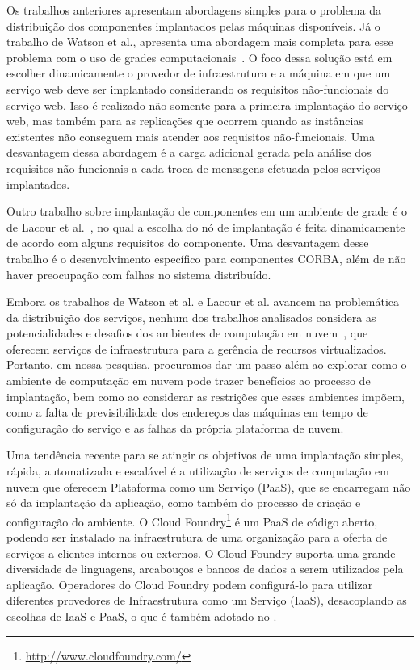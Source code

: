 Os trabalhos anteriores apresentam abordagens simples para o problema da distribuição dos componentes implantados pelas máquinas disponíveis. Já o trabalho de Watson et al., apresenta uma abordagem mais completa para esse problema com o uso de grades computacionais~\cite{Watson2006Dynasoar}. O foco dessa solução está em escolher dinamicamente o provedor de infraestrutura e a máquina em que um serviço web deve ser implantado considerando os requisitos não-funcionais do serviço web. Isso é realizado não somente para a primeira implantação do serviço web, mas também para as replicações que ocorrem quando as instâncias existentes não conseguem mais atender aos requisitos não-funcionais. Uma desvantagem dessa abordagem é a carga adicional gerada pela análise dos requisitos não-funcionais a cada troca de mensagens efetuada pelos serviços implantados. 

Outro trabalho sobre implantação de componentes em um ambiente de grade é o de Lacour et al.~\cite{Lacour2004Corba}, no qual a escolha do nó de implantação é feita dinamicamente de acordo com alguns requisitos do componente. Uma desvantagem desse trabalho é o desenvolvimento específico para componentes CORBA, além de não haver preocupação com falhas no sistema distribuído.

Embora os trabalhos de Watson et al. e Lacour et al. avancem na problemática da distribuição dos serviços, nenhum dos trabalhos analisados considera as potencialidades e desafios dos ambientes de computação em nuvem~\cite{Amazon2012Practices}, que oferecem serviços de infraestrutura para a gerência de recursos virtualizados. Portanto, em nossa pesquisa, procuramos dar um passo além ao explorar como o ambiente de computação em nuvem pode trazer benefícios ao processo de implantação, bem como ao considerar as restrições que esses ambientes impõem, como a falta de previsibilidade dos endereços das máquinas em tempo de configuração do serviço e as falhas da própria plataforma de nuvem.


Uma tendência recente para se atingir os objetivos de uma implantação simples, rápida, automatizada e escalável é a utilização de serviços de computação em nuvem que oferecem Plataforma como um Serviço (PaaS), que se encarregam não só da implantação da aplicação, como também do processo de criação e configuração do ambiente. O Cloud Foundry\footnote{\url{http://www.cloudfoundry.com/}} é um PaaS de código aberto, podendo ser instalado na infraestrutura de uma organização para a oferta de serviços a clientes internos ou externos. O Cloud Foundry suporta uma grande diversidade de linguagens, arcabouços e bancos de dados a serem utilizados pela aplicação. Operadores do Cloud Foundry podem configurá-lo para utilizar diferentes provedores de Infraestrutura como um Serviço (IaaS), desacoplando as escolhas de IaaS e PaaS, o que é também adotado no \ee. 


